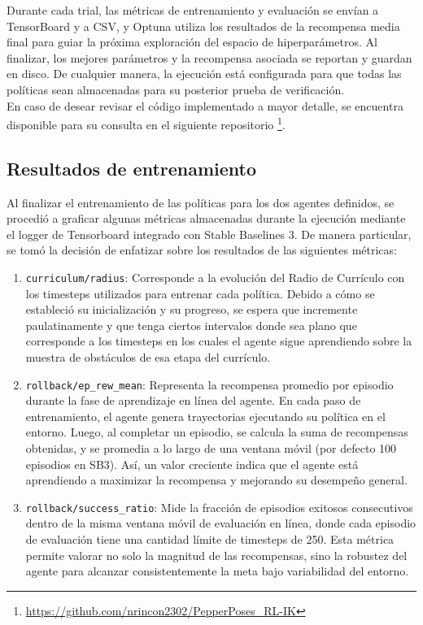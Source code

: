 Durante cada trial, las métricas de entrenamiento y evaluación se envían a TensorBoard y a CSV, y Optuna utiliza los resultados de la recompensa media final para guiar la próxima exploración del espacio de hiperparámetros. Al finalizar, los mejores parámetros y la recompensa asociada se reportan y guardan en disco. De cualquier manera, la ejecución está configurada para que todas las políticas sean almacenadas para su posterior prueba de verificación.\\

En caso de desear revisar el código implementado a mayor detalle, se encuentra disponible para su consulta en el siguiente repositorio \footnote{\url{https://github.com/nrincon2302/PepperPoses_RL-IK}}.\\


\subsection{Resultados de entrenamiento}

Al finalizar el entrenamiento de las políticas para los dos agentes definidos, se procedió a graficar algunas métricas almacenadas durante la ejecución mediante el logger de Tensorboard integrado con Stable Baselines 3. De manera particular, se tomó la decisión de enfatizar sobre los resultados de las siguientes métricas:

\begin{enumerate}
	\item \texttt{curriculum/radius}: Corresponde a la evolución del Radio de Currículo con los timesteps utilizados para entrenar cada política. Debido a cómo se estableció su inicialización y su progreso, se espera que incremente paulatinamente y que tenga ciertos intervalos donde sea plano que corresponde a los timesteps en los cuales el agente sigue aprendiendo sobre la muestra de obstáculos de esa etapa del currículo.
	
	\item \texttt{rollback/ep\_rew\_mean}: Representa la recompensa promedio por episodio durante la fase de aprendizaje en línea del agente. En cada paso de entrenamiento, el agente genera trayectorias ejecutando su política en el entorno. Luego, al completar un episodio, se calcula la suma de recompensas obtenidas, y se promedia a lo largo de una ventana móvil (por defecto 100 episodios en SB3). Así, un valor creciente indica que el agente está aprendiendo a maximizar la recompensa y mejorando su desempeño general.
	
	\item \texttt{rollback/success\_ratio}: Mide la fracción de episodios exitosos consecutivos dentro de la misma ventana móvil de evaluación en línea, donde cada episodio de evaluación tiene una cantidad límite de timesteps de 250. Esta métrica permite valorar no solo la magnitud de las recompensas, sino la robustez del agente para alcanzar consistentemente la meta bajo variabilidad del entorno.
\end{enumerate}

